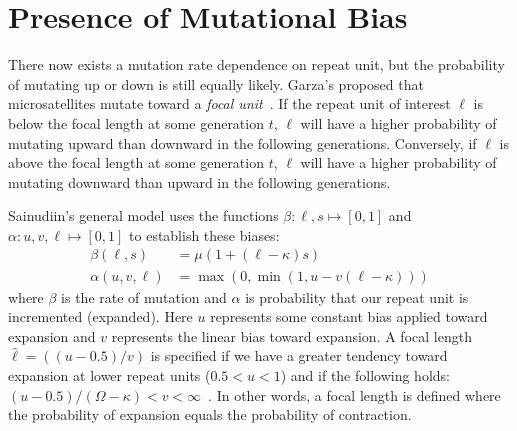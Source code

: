 \section{Presence of Mutational Bias}\label{sec:presenceOfMutationalBias}
There now exists a mutation rate dependence on repeat unit, but the probability of mutating up or down is still
equally likely.
Garza's proposed that microsatellites mutate toward a \emph{focal
unit}~\cite{garzaMicrosatelliteAlleleFrequencies1995}.
If the repeat unit of interest $\ell$ is below the focal length at some generation $t$, $\ell$ will have a higher
probability of mutating upward than downward in the following generations.
Conversely, if $\ell$ is above the focal length at some generation $t$, $\ell$ will have a higher probability of
mutating downward than upward in the following generations.

Sainudiin's general model uses the functions $\beta : \ell, s \mapsto [0, 1]$ and $\alpha : u, v, \ell \mapsto [0, 1]$
to establish these biases:
\begin{align}
    \beta(\ell, s) &= \mu (1 + (\ell - \kappa)s) \\
    \alpha(u, v, \ell) &= \max (0, \min(1, u - v(\ell - \kappa)))
\end{align}
where $\beta$ is the rate of mutation and $\alpha$ is probability that our repeat unit is incremented (expanded).
Here $u$ represents some constant bias applied toward expansion and $v$ represents the linear bias toward expansion.
A focal length $\hat{\ell} = ((u - 0.5) / v)$ is specified if we have a greater tendency toward
expansion at lower repeat units ($0.5 < u < 1$) and if the following holds:
$(u - 0.5) / (\Omega - \kappa) < v < \infty$~\cite{sainudiinMicrosatelliteMutationModels2004}.
In other words, a focal length is defined where the probability of expansion equals the probability of contraction.

